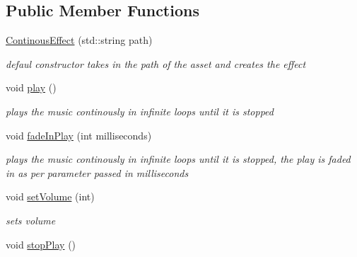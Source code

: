 \subsection*{Public Member Functions}
\begin{DoxyCompactItemize}
\item 
\hypertarget{class_continous_effect_a1c55132ad8a75afce61b94e65b9e4345}{}\label{class_continous_effect_a1c55132ad8a75afce61b94e65b9e4345} 
\hyperlink{class_continous_effect_a1c55132ad8a75afce61b94e65b9e4345}{Continous\+Effect} (std\+::string path)
\begin{DoxyCompactList}\small\item\em defaul constructor takes in the path of the asset and creates the effect \end{DoxyCompactList}\item 
\hypertarget{class_continous_effect_ad11a2039ff7d35d1f903c902d5cc4745}{}\label{class_continous_effect_ad11a2039ff7d35d1f903c902d5cc4745} 
void \hyperlink{class_continous_effect_ad11a2039ff7d35d1f903c902d5cc4745}{play} ()
\begin{DoxyCompactList}\small\item\em plays the music continously in infinite loops until it is stopped \end{DoxyCompactList}\item 
\hypertarget{class_continous_effect_af8c6963f5bfe8c4cd25db9b544a6fe41}{}\label{class_continous_effect_af8c6963f5bfe8c4cd25db9b544a6fe41} 
void \hyperlink{class_continous_effect_af8c6963f5bfe8c4cd25db9b544a6fe41}{fade\+In\+Play} (int milliseconds)
\begin{DoxyCompactList}\small\item\em plays the music continously in infinite loops until it is stopped, the play is faded in as per parameter passed in milliseconds \end{DoxyCompactList}\item 
\hypertarget{class_continous_effect_aaa3243438b57bd0d5283270d89bf9722}{}\label{class_continous_effect_aaa3243438b57bd0d5283270d89bf9722} 
void \hyperlink{class_continous_effect_aaa3243438b57bd0d5283270d89bf9722}{set\+Volume} (int)
\begin{DoxyCompactList}\small\item\em sets volume \end{DoxyCompactList}\item 
\hypertarget{class_continous_effect_a8729a32d070711d4f915c51a64724340}{}\label{class_continous_effect_a8729a32d070711d4f915c51a64724340} 
void \hyperlink{class_continous_effect_a8729a32d070711d4f915c51a64724340}{stop\+Play} ()

\end{DoxyCompactItemize}
